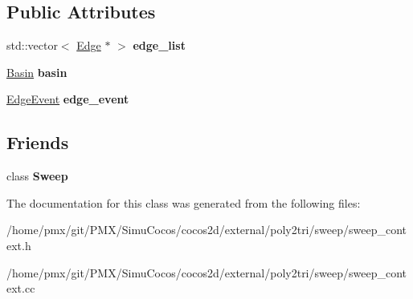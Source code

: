 \subsection*{Public Attributes}
\begin{DoxyCompactItemize}
\item 
\mbox{\label{classp2t_1_1SweepContext_a68645009952205504856a17846c762ce}} 
std\+::vector$<$ \hyperlink{structp2t_1_1Edge}{Edge} $\ast$ $>$ {\bfseries edge\+\_\+list}
\item 
\mbox{\label{classp2t_1_1SweepContext_a79c599f974533a926b6a9ec73870e7d4}} 
\hyperlink{structp2t_1_1SweepContext_1_1Basin}{Basin} {\bfseries basin}
\item 
\mbox{\label{classp2t_1_1SweepContext_a86a138afe29697cfcd33158ec59c663e}} 
\hyperlink{structp2t_1_1SweepContext_1_1EdgeEvent}{Edge\+Event} {\bfseries edge\+\_\+event}
\end{DoxyCompactItemize}
\subsection*{Friends}
\begin{DoxyCompactItemize}
\item 
\mbox{\label{classp2t_1_1SweepContext_a202298be2e52b0b25163e00cd5bea47a}} 
class {\bfseries Sweep}
\end{DoxyCompactItemize}


The documentation for this class was generated from the following files\+:\begin{DoxyCompactItemize}
\item 
/home/pmx/git/\+P\+M\+X/\+Simu\+Cocos/cocos2d/external/poly2tri/sweep/sweep\+\_\+context.\+h\item 
/home/pmx/git/\+P\+M\+X/\+Simu\+Cocos/cocos2d/external/poly2tri/sweep/sweep\+\_\+context.\+cc\end{DoxyCompactItemize}
